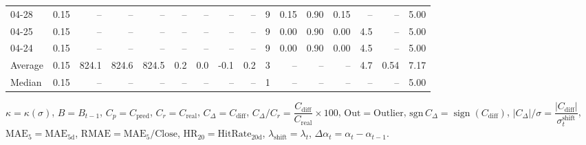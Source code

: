 \begin{threeparttable}
{\begin{tabular}{lrrrrrrrrrrrrrrr}
  04-28 &     0.15 &    -- &    -- &    -- &         -- &             -- &                       -- &                  -- &              9 &       0.15 &      0.90 &           0.15 &               -- &              -- &                   5.00 \\
  04-25 &     0.15 &    -- &    -- &    -- &         -- &             -- &                       -- &                  -- &              9 &       0.00 &      0.90 &           0.00 &              4.5 &              -- &                   5.00 \\
  04-24 &     0.15 &    -- &    -- &    -- &         -- &             -- &                       -- &                  -- &              9 &       0.00 &      0.90 &           0.00 &              4.5 &              -- &                   5.00 \\
Average &     0.15 & 824.1 & 824.6 & 824.5 &        0.2 &            0.0 &                     -0.1 &                 0.2 &              3 &         -- &        -- &             -- &              4.7 &            0.54 &                   7.17 \\
 Median &     0.15 &    -- &    -- &    -- &         -- &             -- &                       -- &                  -- &              1 &         -- &        -- &             -- &               -- &              -- &                   5.00 \\
\bottomrule
\end{tabular}
}
\begin{tablenotes}\footnotesize
\item $\kappa=\kappa(\sigma)$, $B=B_{t-1}$, $C_p=C_{\text{pred}}$, $C_r=C_{\text{real}}$, $C_\Delta=C_{\text{diff}}$, $C_\Delta/C_r=\dfrac{C_{\text{diff}}}{C_{\text{real}}}\times100$, $\mathrm{Out}=\text{Outlier}$, $\mathrm{sgn}\,C_\Delta=\operatorname{sign}(C_{\text{diff}})$, $|C_\Delta|/\sigma=\dfrac{|C_{\text{diff}}|}{\sigma_t^{\text{shift}}}$, $\mathrm{MAE}_5=\mathrm{MAE}_{5\text{d}}$, $\mathrm{RMAE}= \mathrm{MAE}_5 / \text{Close}$, $\mathrm{HR}_{20}=\mathrm{HitRate}_{20\text{d}}$, 
$\lambda_{\text{shift}}=\lambda_t$, 
$\Delta\alpha_t=\alpha_t-\alpha_{t-1}$.
\end{tablenotes}
\end{threeparttable}
\endgroup

